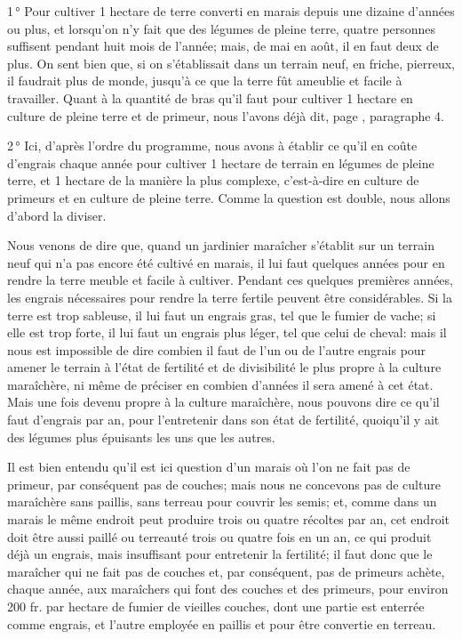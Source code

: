 \documentclass[10pt,a4paper]{book}
\begin{document}
1\,° Pour cultiver 1 hectare de terre converti en marais depuis une dizaine d'années ou plus, et lorsqu'on n'y fait que des légumes de pleine terre, quatre personnes suffisent pendant huit mois de l'année; mais, de mai en août, il en faut deux de plus. On sent bien que, si on s'établissait dans un terrain neuf, en friche, pierreux, il faudrait plus de monde, jusqu'à ce que la terre fût ameublie et facile à travailler. Quant à la quantité de bras qu'il faut pour cultiver 1 hectare en culture de pleine terre et de primeur, nous l'avons déjà dit, page \pageref{personnel}, paragraphe 4.

2\,° Ici, d'après l'ordre du programme, nous avons à établir ce qu'il en coûte d'engrais chaque année pour cultiver 1 hectare de terrain en légumes de pleine terre, et 1 hectare de la manière la plus complexe, c'est-à-dire en culture de primeurs et en culture de pleine terre. Comme la question est double, nous allons d'abord la diviser.

Nous venons de dire que, quand un jardinier maraîcher s'établit sur un terrain neuf qui n'a pas encore été cultivé en marais, il lui faut quelques années pour en rendre la terre meuble et facile à cultiver. Pendant ces quelques premières années, les engrais nécessaires pour rendre la terre fertile peuvent être considérables. Si la terre est trop sableuse, il lui faut un engrais gras, tel que le fumier de vache; si elle est trop forte, il lui faut un engrais plus léger, tel que celui de cheval: mais il nous est impossible de dire combien il faut de l'un ou de l'autre engrais pour amener le terrain à l'état de fertilité et de divisibilité le plus propre à la culture maraîchère, ni même de préciser en combien d'années il sera amené à cet état. Mais une fois devenu propre à la culture maraîchère, nous pouvons dire ce qu'il faut d'engrais par an, pour l'entretenir dans son état de fertilité, quoiqu'il y ait des légumes plus épuisants les uns que les autres.

Il est bien entendu qu'il est ici question d'un marais où l'on ne fait pas de primeur, par conséquent pas de couches; mais nous ne concevons pas de culture maraîchère sans paillis, sans terreau pour couvrir les semis; et, comme dans un marais le même endroit peut produire trois ou quatre récoltes par an, cet endroit doit être aussi paillé ou terreauté trois ou quatre fois en un an, ce qui produit déjà un engrais, mais insuffisant pour entretenir la fertilité; il faut donc que le maraîcher qui ne fait pas de couches et, par conséquent, pas de primeurs achète, chaque année, aux maraîchers qui font des couches et des primeurs, pour environ 200 fr. par hectare de fumier de vieilles couches, dont une partie est enterrée comme engrais, et l'autre employée en paillis et pour être convertie en terreau.
\end{document}
